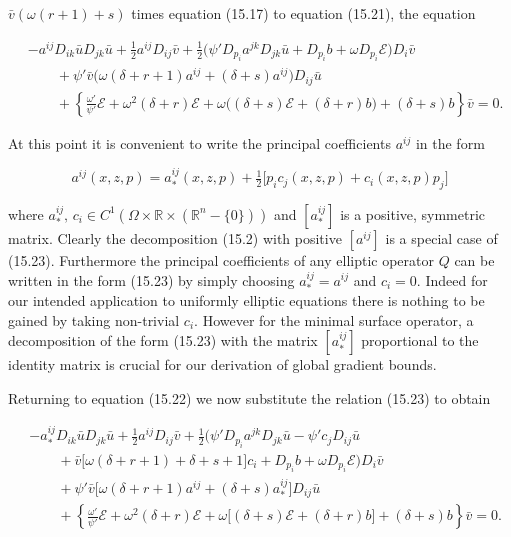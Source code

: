 $\bar{v}(\omega(r+1)+s)$ times equation (15.17) to equation (15.21), the equation

\begin{equation}
\begin{aligned}
&-a^{ij}D_{ik}\bar{u}D_{jk}\bar{u}+\tfrac12a^{ij}D_{ij}\bar{v}
+\tfrac12\bigl(\psi' D_{p_i}a^{jk}D_{jk}\bar{u}+D_{p_i}b+\omega D_{p_i}\mathcal{E}\bigr)D_i\bar{v}\\
&\qquad+\psi'\bar{v}\bigl(\omega(\delta+r+1)a^{ij}+(\delta+s)a^{ij}\bigr)D_{ij}\bar{u}\\
&\qquad+\left\{\frac{\omega'}{\psi'}\mathcal{E}+\omega^2(\delta+r)\mathcal{E}
+\omega\bigl((\delta+s)\mathcal{E}+(\delta+r)b\bigr)+(\delta+s)b\right\}\bar{v}=0.
\end{aligned}
\tag{15.22}
\end{equation}

At this point it is convenient to write the principal coefficients $a^{ij}$ in the form

\begin{equation}
a^{ij}(x,z,p)=a^{ij}_{*}(x,z,p)+\tfrac12\bigl[p_ic_{j}(x,z,p)+c_i(x,z,p)p_j\bigr]
\tag{15.23}
\end{equation}

where $a^{ij}_{*},\,c_i\in C^1(\Omega\times\mathbb{R}\times(\mathbb{R}^n-\{0\}))$ and
$[a^{ij}_{*}]$ is a positive, symmetric matrix. Clearly the decomposition (15.2) with positive
$[a^{ij}]$ is a special case of (15.23). Furthermore the principal coefficients of any elliptic
operator $Q$ can be written in the form (15.23) by simply choosing $a^{ij}_{*}=a^{ij}$ and
$c_i=0$. Indeed for our intended application to uniformly elliptic equations there is nothing
to be gained by taking non-trivial $c_i$. However for the minimal surface operator, a decomposition
of the form (15.23) with the matrix $[a^{ij}_{*}]$ proportional to the identity matrix is crucial
for our derivation of global gradient bounds.

Returning to equation (15.22) we now substitute the relation (15.23) to obtain

\begin{equation}
\begin{aligned}
&-a^{ij}_{*}D_{ik}\bar{u}D_{jk}\bar{u}+\tfrac12a^{ij}D_{ij}\bar{v}
+\tfrac12\bigl(\psi' D_{p_i}a^{jk}D_{jk}\bar{u}-\psi'c_jD_{ij}\bar{u}\\
&\qquad+\bar{v}\bigl[\omega(\delta+r+1)+\delta+s+1\bigr]c_i+D_{p_i}b+\omega D_{p_i}\mathcal{E}\bigr)D_i\bar{v}\\
&\qquad+\psi'\bar{v}\bigl[\omega(\delta+r+1)a^{ij}+(\delta+s)a^{ij}_{*}\bigr]D_{ij}\bar{u}\\
&\qquad+\left\{\frac{\omega'}{\psi'}\mathcal{E}+\omega^2(\delta+r)\mathcal{E}
+\omega\bigl[(\delta+s)\mathcal{E}+(\delta+r)b\bigr]+(\delta+s)b\right\}\bar{v}=0.
\end{aligned}
\tag{15.24}
\end{equation}

